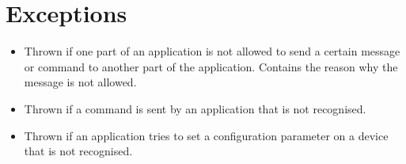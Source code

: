\section{Exceptions}\label{sec:exceptions}
\begin{itemize}[nolistsep,noitemsep]
\item {}
Thrown if one part of an application is not allowed to send a certain message or command to another part of the application. Contains the reason why the message is not allowed.
\item {}
Thrown if a command is sent by an application that is not recognised.
\item {}
Thrown if an application tries to set a configuration parameter on a device that is not recognised.
\end{itemize}

